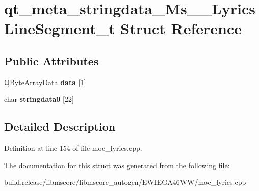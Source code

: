\hypertarget{structqt__meta__stringdata___ms_____lyrics_line_segment__t}{}\section{qt\+\_\+meta\+\_\+stringdata\+\_\+\+Ms\+\_\+\+\_\+\+Lyrics\+Line\+Segment\+\_\+t Struct Reference}
\label{structqt__meta__stringdata___ms_____lyrics_line_segment__t}
\subsection*{Public Attributes}
\begin{DoxyCompactItemize}
\item 
\mbox{\label{structqt__meta__stringdata___ms_____lyrics_line_segment__t_a849938ebbf21af2c380b914009b7144a}} 
Q\+Byte\+Array\+Data {\bfseries data} \mbox{[}1\mbox{]}
\item 
\mbox{\label{structqt__meta__stringdata___ms_____lyrics_line_segment__t_a71847709c11ba8bfbb0a55f4f111ff39}} 
char {\bfseries stringdata0} \mbox{[}22\mbox{]}
\end{DoxyCompactItemize}


\subsection{Detailed Description}


Definition at line 154 of file moc\+\_\+lyrics.\+cpp.



The documentation for this struct was generated from the following file\+:\begin{DoxyCompactItemize}
\item 
build.\+release/libmscore/libmscore\+\_\+autogen/\+E\+W\+I\+E\+G\+A46\+W\+W/moc\+\_\+lyrics.\+cpp\end{DoxyCompactItemize}
